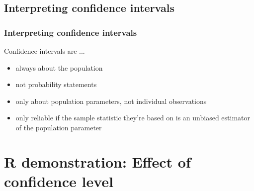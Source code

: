 \documentclass[t,compress,mathserif]{beamer}
\begin{document}

\subsection{Interpreting confidence intervals}


\begin{frame}
\frametitle{Interpreting confidence intervals}

Confidence intervals are ...

\begin{itemize}

\item always about the population

\item not probability statements 

\item only about population parameters, not individual observations

\item only reliable if the sample statistic they're based on is an unbiased estimator of the population parameter

\end{itemize}

\end{frame}


\section{R demonstration: Effect of confidence level}


\end{document}

